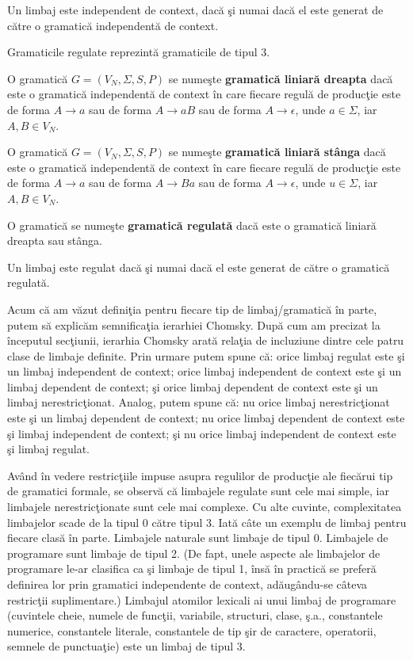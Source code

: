 Un limbaj este independent de context, dacă şi numai dacă el este generat de către o gramatică independentă de context.

Gramaticile regulate reprezintă gramaticile de tipul 3.

\begin{definitie}
O gramatică $G = (V_{N}, \Sigma, S, P )$ se numeşte \textbf{gramatică liniară dreapta} dacă este o gramatică independentă de context în care fiecare regulă de producţie este de forma $A \rightarrow a$ sau de forma $A \rightarrow aB$ sau de forma $A \rightarrow \epsilon$, unde $a \in \Sigma$, iar $A, B \in V_{N}$.
\end{definitie}

\begin{definitie}
O gramatică $G = (V_{N}, \Sigma, S, P )$ se numeşte \textbf{gramatică liniară stânga} dacă este o gramatică independentă de context în care fiecare regulă de producţie este de forma $A \rightarrow a$ sau de forma $A \rightarrow Ba$ sau de forma $A \rightarrow \epsilon$, unde $u \in \Sigma$, iar $A, B \in V_{N}$.
\end{definitie}

\begin{definitie}
O gramatică se numeşte \textbf{gramatică regulată} dacă este o gramatică liniară dreapta sau stânga.
\end{definitie}

Un limbaj este regulat dacă şi numai dacă el este generat de către o gramatică regulată.

Acum că am văzut definiţia pentru fiecare tip de limbaj/gramatică în parte, putem să explicăm semnificaţia ierarhiei Chomsky. După cum am precizat la începutul secţiunii, ierarhia Chomsky arată relaţia de incluziune dintre cele patru clase de limbaje definite. Prin urmare putem spune că: orice limbaj regulat este şi un limbaj independent de context; orice limbaj independent de context este şi un limbaj dependent de context; şi orice limbaj dependent de context este şi un limbaj nerestricţionat. Analog, putem spune că: nu orice limbaj nerestricţionat este şi un limbaj dependent de context; nu orice limbaj dependent de context este şi limbaj independent de context; şi nu orice limbaj independent de context este şi limbaj regulat.

Având în vedere restricţiile impuse asupra regulilor de producţie ale fiecărui tip de gramatici formale, se observă că limbajele regulate sunt cele mai simple, iar limbajele nerestricţionate sunt cele mai complexe. Cu alte cuvinte, complexitatea limbajelor scade de la tipul 0 către tipul 3. Iată câte un exemplu de limbaj pentru fiecare clasă în parte. Limbajele naturale sunt limbaje de tipul 0. Limbajele de programare sunt limbaje de tipul 2. (De fapt, unele aspecte ale limbajelor de programare le-ar clasifica ca şi limbaje de tipul 1, însă în practică se preferă definirea lor prin gramatici independente de context, adăugându-se câteva restricţii suplimentare.) Limbajul atomilor lexicali ai unui limbaj de programare (cuvintele cheie, numele de funcţii, variabile, structuri, clase, ş.a., constantele numerice, constantele literale, constantele de tip şir de caractere, operatorii, semnele de punctuaţie) este un limbaj de tipul 3.

